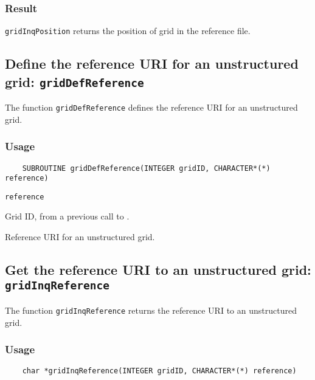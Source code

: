 \subsubsection*{Result}

{\tt gridInqPosition} returns the position of grid in the reference file.


\subsection{Define the reference URI for an unstructured grid: {\tt gridDefReference}}
\label{gridDefReference}

The function {\tt gridDefReference} defines the reference URI for an unstructured grid.

\subsubsection*{Usage}

\begin{verbatim}
    SUBROUTINE gridDefReference(INTEGER gridID, CHARACTER*(*) reference)
\end{verbatim}

\hspace*{4mm}\begin{minipage}[]{15cm}
\begin{deflist}{\tt reference\ }
\item[{\tt gridID}]
Grid ID, from a previous call to {}.
\item[{\tt reference}]
Reference URI for an unstructured grid.

\end{deflist}
\end{minipage}


\subsection{Get the reference URI to an unstructured grid: {\tt gridInqReference}}
\label{gridInqReference}

The function {\tt gridInqReference} returns the reference URI to an unstructured grid.

\subsubsection*{Usage}

\begin{verbatim}
    char *gridInqReference(INTEGER gridID, CHARACTER*(*) reference)
\end{verbatim}


